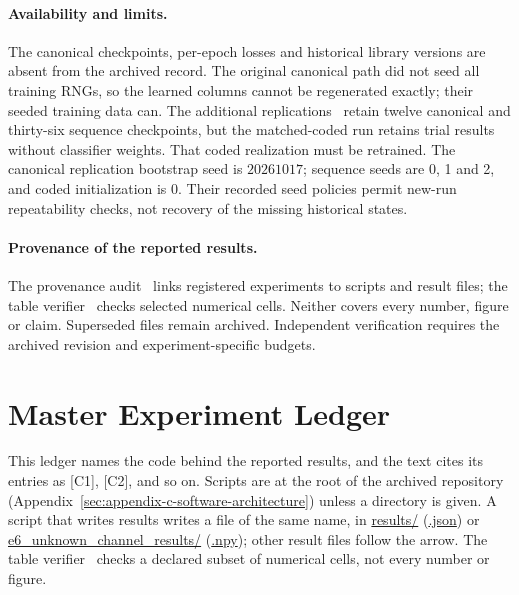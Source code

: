 \paragraph{Availability and limits.} The canonical checkpoints, per-epoch losses and historical library versions are absent from the archived record. The original canonical path did not seed all training RNGs, so the learned columns cannot be regenerated exactly; their seeded training data can. The additional replications~ retain twelve canonical and thirty-six sequence checkpoints, but the matched-coded run retains trial results without classifier weights. That coded realization must be retrained. The canonical replication bootstrap seed is $20261017$; sequence seeds are 0, 1 and 2, and coded initialization is 0. Their recorded seed policies permit new-run repeatability checks, not recovery of the missing historical states.

\paragraph{Provenance of the reported results.} The provenance audit~ links registered experiments to scripts and result files; the table verifier~ checks selected numerical cells. Neither covers every number, figure or claim. Superseded files remain archived. Independent verification requires the archived revision and experiment-specific budgets.

\clearpage

\section{Master Experiment Ledger}\label{sec:appendix-e-master-experiment-ledger}

This ledger names the code behind the reported results, and the text cites its entries as [C1], [C2], and so on. Scripts are at the root of the archived repository (Appendix~\ref{sec:appendix-c-software-architecture}) unless a directory is given. A script that writes results writes a file of the same name, in \url{results/} (\url{.json}) or \url{e6_unknown_channel_results/} (\url{.npy}); other result files follow the arrow. The table verifier~ checks a declared subset of numerical cells, not every number or figure.

